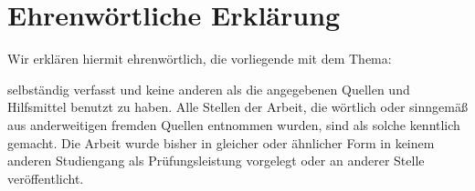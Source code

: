 \chapter*{Ehrenwörtliche Erklärung}
Wir erklären hiermit ehrenwörtlich, die vorliegende \arbeit{} mit dem Thema:
\begin{quote}
	\textit{\titel}
\end{quote} 
selbständig verfasst und keine anderen als die angegebenen Quellen und Hilfsmittel benutzt zu haben. Alle Stellen der Arbeit, die wörtlich oder sinngemäß aus anderweitigen fremden Quellen entnommen wurden, sind als solche kenntlich gemacht. Die Arbeit wurde bisher in gleicher oder ähnlicher Form in keinem anderen Studiengang als Prüfungsleistung vorgelegt oder an anderer Stelle veröffentlicht.